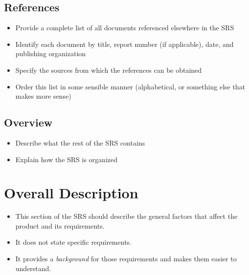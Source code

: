 \documentclass[]{article}
\begin{document}
\subsection{References}
\label{sub:references}
\begin{itemize}
	\item Provide a complete list of all documents referenced elsewhere in the SRS
	\item Identify each document by title, report number (if applicable), date, and publishing organization
	\item Specify the sources from which the references can be obtained
	\item Order this list in some sensible manner (alphabetical, or something else that makes more sense)
\end{itemize}

\subsection{Overview}
\label{sub:overview}
\begin{itemize}
	\item Describe what the rest of the SRS contains
	\item Explain how the SRS is organized
\end{itemize}


\section{Overall Description}
\label{sec:overall_description}

\begin{itemize}
	\item This section of the SRS should describe the general factors that affect the product and its requirements. 
	\item It does not state specific requirements.
	\item It provides a \emph{background} for those requirements and makes them easier to understand.
\end{itemize}
\end{document}
